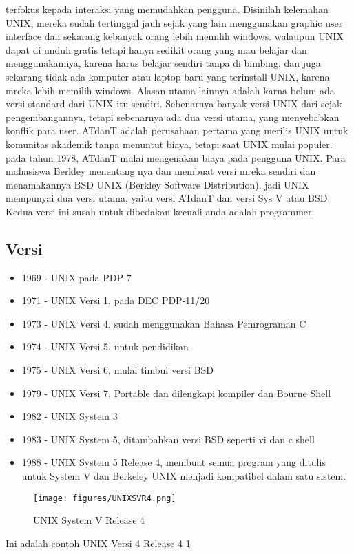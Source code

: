 terfokus kepada interaksi yang memudahkan pengguna. Disinilah kelemahan UNIX, mereka sudah tertinggal jauh sejak yang lain menggunakan graphic user interface dan sekarang kebanyak orang lebih memilih windows. walaupun UNIX dapat di unduh gratis tetapi hanya sedikit orang yang mau belajar dan menggunakannya, karena harus belajar sendiri tanpa di bimbing, dan juga sekarang tidak ada komputer atau laptop baru yang terinstall UNIX, karena mreka lebih memilih windows. Alasan utama lainnya adalah karna belum ada versi standard dari UNIX itu sendiri. Sebenarnya banyak versi UNIX dari sejak pengembangannya, tetapi sebenarnya ada dua versi utama, yang menyebabkan konflik para user. ATdanT adalah perusahaan pertama yang merilis UNIX untuk komunitas akademik tanpa menuntut biaya, tetapi saat UNIX mulai populer. pada tahun 1978, ATdanT mulai mengenakan biaya pada pengguna UNIX. Para mahasiswa Berkley menentang nya dan membuat versi mreka sendiri dan menamakannya BSD UNIX (Berkley Software Distribution). jadi UNIX mempunyai dua versi utama, yaitu versi ATdanT dan versi Sys V atau BSD. Kedua versi ini susah untuk dibedakan kecuali anda adalah programmer.
	
		\subsection{Versi}
		\begin{itemize}
			\item 1969 - UNIX pada PDP-7
			\item 1971 - UNIX Versi 1, pada DEC PDP-11/20
			\item 1973 - UNIX Versi 4, sudah menggunakan Bahasa Pemrograman C
			\item 1974 - UNIX Versi 5, untuk pendidikan
			\item 1975 - UNIX Versi 6, mulai timbul versi BSD
			\item 1979 - UNIX Versi 7, Portable dan dilengkapi kompiler dan Bourne Shell
			\item 1982 - UNIX System 3
			\item 1983 - UNIX System 5, ditambahkan versi BSD seperti vi dan c shell
			\item 1988 - UNIX System 5 Release 4, membuat semua program yang ditulis untuk System V dan Berkeley UNIX menjadi kompatibel dalam satu sistem.
		\end{itemize}
			\begin{figure}[ht]
			\centerline{\texttt{[image: figures/UNIXSVR4.png]}}
			\caption{UNIX System V Release 4}
			\label{UNIXSVR4}
			\end{figure}
		Ini adalah contoh UNIX Versi 4 Release 4 \ref{UNIXSVR4}
		

